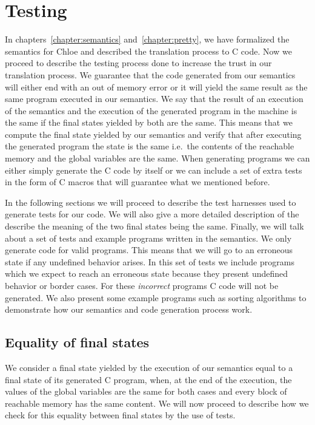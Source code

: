 \chapter{Testing}\label{chapter:testing}

In chapters~\ref{chapter:semantics} and~\ref{chapter:pretty}, we have formalized the semantics for Chloe and described the translation process to C code.
Now we proceed to describe the testing process done to increase the trust in our translation process.
We guarantee that the code generated from our semantics will either end with an out of memory error or it will yield the same result as the same program executed in our semantics.
We say that the result of an execution of the semantics and the execution of the generated program in the machine is the same if the final states yielded by both are the same.
This means that we compute the final state yielded by our semantics and verify that after executing the generated program the state is the same i.e.\ the contents of the reachable memory and the global variables are the same.
When generating programs we can either simply generate the C code by itself or we can include a set of extra tests in the form of C macros that will guarantee what we mentioned before.

In the following sections we will proceed to describe the test harnesses used to generate tests for our code.
We will also give a more detailed description of the describe the meaning of the two final states being the same.
Finally, we will talk about a set of tests and example programs written in the semantics.
We only generate code for valid programs.
This means that we will go to an erroneous state if any undefined behavior arises.
In this set of tests we include programs which we expect to reach an erroneous state because they present undefined behavior or border cases.
For these \textit{incorrect} programs C code will not be generated.
We also present some example programs such as sorting algorithms to demonstrate how our semantics and code generation process work.


\section{Equality of final states}

We consider a final state yielded by the execution of our semantics equal to a final state of its generated C program, when, at the end of the execution, the values of the global variables are the same for both cases and every block of reachable memory has the same content.
We will now proceed to describe how we check for this equality between final states by the use of tests.

